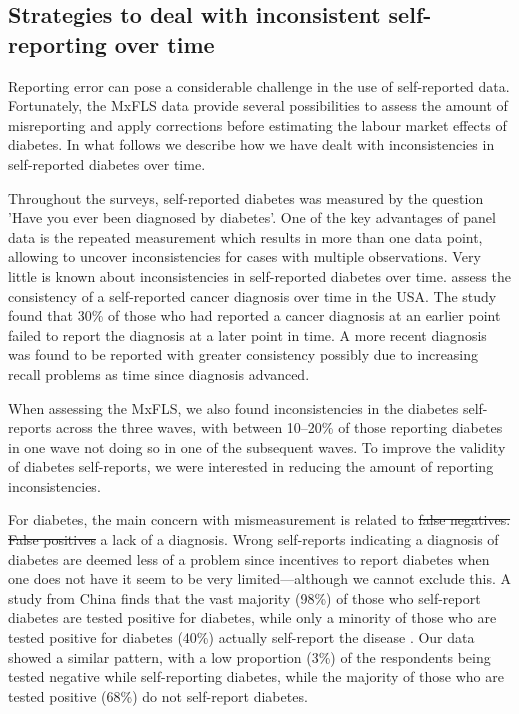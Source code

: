 \documentclass[12pt,english]{article}
\providecommand{\DIFaddtex}[1]{{\protect\color{blue}#1}} %
\providecommand{\DIFdeltex}[1]{{\protect\color{red}\sout{#1}}}                      %
\providecommand{\DIFaddbegin}{} %
\providecommand{\DIFaddend}{} %
\providecommand{\DIFdelbegin}{} %
\providecommand{\DIFdelend}{} %
\providecommand{\DIFadd}[1]{\texorpdfstring{\DIFaddtex{#1}}{#1}} %
\providecommand{\DIFdel}[1]{\texorpdfstring{\DIFdeltex{#1}}{}} %
\begin{document}
\subsection*{\label{sec:Appendix}Strategies to deal with inconsistent self-reporting over time}

Reporting error can pose a considerable challenge in the use of self-reported data. Fortunately, the \ac{MxFLS} data provide several possibilities to assess the amount of misreporting and apply corrections before estimating the labour market effects of diabetes. In what follows we describe how we have dealt with inconsistencies in self-reported diabetes over time.

Throughout the surveys, self-reported diabetes was measured by the question 'Have you ever been diagnosed by diabetes'. One of the key advantages of panel data is the repeated measurement which results in more than one data point, allowing to uncover inconsistencies for cases with multiple observations. Very little is known about inconsistencies in self-reported diabetes over time. \textcite{Zajacova2010} assess the consistency of a self-reported cancer diagnosis over time in the USA. The study found that 30\% of those who had reported a cancer diagnosis at an earlier point failed to report the diagnosis at a later point in time. A more recent diagnosis was found to be reported with greater consistency possibly due to increasing recall problems as time since diagnosis advanced.

When assessing the \ac{MxFLS}, we also found inconsistencies in the diabetes self-reports across the three waves, with between 10--20\% of those reporting diabetes in one wave not doing so in one of the subsequent waves. To improve the validity of diabetes self-reports, we were interested in reducing the amount of reporting inconsistencies.

For diabetes, the main concern with mismeasurement is related to \DIFdelbegin \DIFdel{false negatives. False positives }\DIFdelend \DIFaddbegin \DIFadd{a lack of a diagnosis. Wrong self-reports indicating a diagnosis of diabetes }\DIFaddend are deemed less of a problem since incentives to report diabetes when one does not have it seem to be very limited---although we cannot exclude this.  A study from China finds that the vast majority (98\%) of those who self-report diabetes are tested positive for diabetes, while only a minority  of those who are tested positive for diabetes (40\%) actually self-report the disease \parencite{Yuan2015}.  Our data showed a similar pattern, with a low proportion (3\%) of the respondents being tested negative while self-reporting diabetes, while the majority of those who are tested positive (68\%) do not self-report diabetes.
\end{document}
